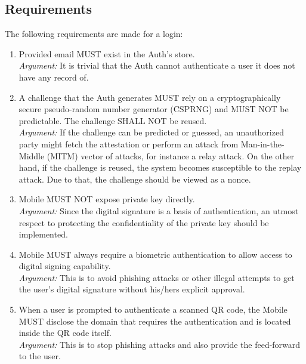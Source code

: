     \subsection{Requirements}
    The following requirements are made for a login:
        \begin{enumerate}
            \item Provided email MUST exist in the Auth's store.\\
            \textit{Argument:} It is trivial that the Auth cannot authenticate a user it does not have any record
                               of.         

            \item A challenge that the Auth generates MUST rely on a cryptographically secure pseudo-random number 
                  generator (CSPRNG) and MUST NOT be predictable. The challenge SHALL NOT be reused.\\
            \textit{Argument:} If the challenge can be predicted or guessed, an unauthorized party might fetch the
                               attestation or perform an attack from Man-in-the-Middle (MITM) vector of attacks, for
                               instance a relay attack. On the other hand, if the challenge is reused, the system 
                               becomes susceptible to the replay attack. Due to that, the challenge should be 
                               viewed as a nonce.

            \item Mobile MUST NOT expose private key directly.\\
            \textit{Argument:} Since the digital signature is a basis of authentication, an utmost respect to 
                               protecting the confidentiality of the private key should be implemented.

            \item Mobile MUST always require a biometric authentication to allow access to digital signing 
                  capability.\\        
            \textit{Argument:} This is to avoid phishing attacks or other illegal attempts to get the user's 
                               digital signature without his/hers explicit approval.

            \item When a user is prompted to authenticate a scanned QR code, the Mobile MUST disclose the domain that 
                  requires the authentication and is located inside the QR code itself.\\
            \textit{Argument:} This is to stop phishing attacks and also provide the feed-forward to the user.


\end{enumerate}
